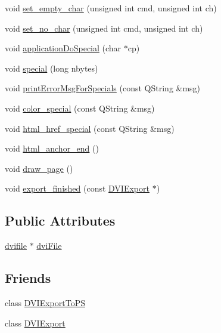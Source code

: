 \begin{DoxyCompactItemize}
\item 
void \hyperlink{classdviRenderer_a96fba91804fe14b87b554192fb772cb3}{set\+\_\+empty\+\_\+char} (unsigned int cmd, unsigned int ch)
\item 
void \hyperlink{classdviRenderer_af39ff19024aab0a2da12815c14851f19}{set\+\_\+no\+\_\+char} (unsigned int cmd, unsigned int ch)
\item 
void \hyperlink{classdviRenderer_a4aef6b7d6eb3866681590f172afad781}{application\+Do\+Special} (char $\ast$cp)
\item 
void \hyperlink{classdviRenderer_a32c6c3b2d90c0c3b75977d6de1e8bc59}{special} (long nbytes)
\item 
void \hyperlink{classdviRenderer_ae8aea1960b6629e2559e4d73da894faf}{print\+Error\+Msg\+For\+Specials} (const Q\+String \&msg)
\item 
void \hyperlink{classdviRenderer_ad233897e0a40650628ba6fc8bd3d87b0}{color\+\_\+special} (const Q\+String \&msg)
\item 
void \hyperlink{classdviRenderer_a2dfcf48566f5cb649c8110d3c79dc945}{html\+\_\+href\+\_\+special} (const Q\+String \&msg)
\item 
void \hyperlink{classdviRenderer_a3967eeda01307c73467bfc47465cde6c}{html\+\_\+anchor\+\_\+end} ()
\item 
void \hyperlink{classdviRenderer_a88550ffd9961878d36b244b21edb7647}{draw\+\_\+page} ()
\item 
void \hyperlink{classdviRenderer_a91b346176bd12e95a8c962afb425b8e1}{export\+\_\+finished} (const \hyperlink{classDVIExport}{D\+V\+I\+Export} $\ast$)
\end{DoxyCompactItemize}
\subsection*{Public Attributes}
\begin{DoxyCompactItemize}
\item 
\hyperlink{classdvifile}{dvifile} $\ast$ \hyperlink{classdviRenderer_a67ded13a1a8da343aa0ee921ed96d4c2}{dvi\+File}
\end{DoxyCompactItemize}
\subsection*{Friends}
\begin{DoxyCompactItemize}
\item 
class \hyperlink{classdviRenderer_a741d5e51c874df4d150f2c4b35491790}{D\+V\+I\+Export\+To\+P\+S}
\item 
class \hyperlink{classdviRenderer_af00868f58c699150d1a8c3a8f4ac592c}{D\+V\+I\+Export}
\end{DoxyCompactItemize}



